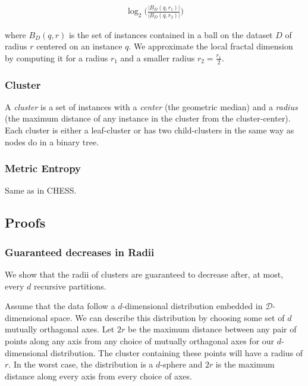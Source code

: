 \begin{gather}
    \log_2\bigg(\frac{|B_D(q, r_1)|}{|B_D(q, r_2)|}\bigg)
    \label{fractal-dimension}
\end{gather}

where $B_D(q,r)$ is the set of instances contained in a ball on the dataset $D$ of radius $r$ centered on an instance $q$.
We approximate the local fractal dimension by computing it for a radius $r_1$ and a smaller radius $r_2=\frac{r_1}{2}$.

\subsubsection{Cluster}
\label{subsubsec:methods:definitions:cluster}

A \textit{cluster} is a set of instances with a \textit{center} (the geometric median) and a \textit{radius} (the maximum distance of any instance in the cluster from the cluster-center).
Each cluster is either a leaf-cluster or has two child-clusters in the same way as nodes do in a binary tree.

\subsubsection{Metric Entropy}
\label{subsubsec:methods:definitions:metric-entropy}

Same as in CHESS.

\subsection{Proofs}
\label{subsec:methods:proofs}

\subsubsection{Guaranteed decreases in Radii}
\label{subsubsec:methods:proofs:radii-decrease}

We show that the radii of clusters are guaranteed to decrease after, at most, every $d$ recursive partitions.

Assume that the data follow a $d$-dimensional distribution embedded in $\mathcal{D}$-dimensional space.
We can describe this distribution by choosing some set of $d$ mutually orthagonal axes.
Let $2r$ be the maximum distance between any pair of points along any axis from any choice of mutually orthagonal axes for our $d$-dimensional distribution.
The cluster containing these points will have a radius of $r$.
In the worst case, the distribution is a $d$-sphere and $2r$ is the maximum distance along every axis from every choice of axes.

